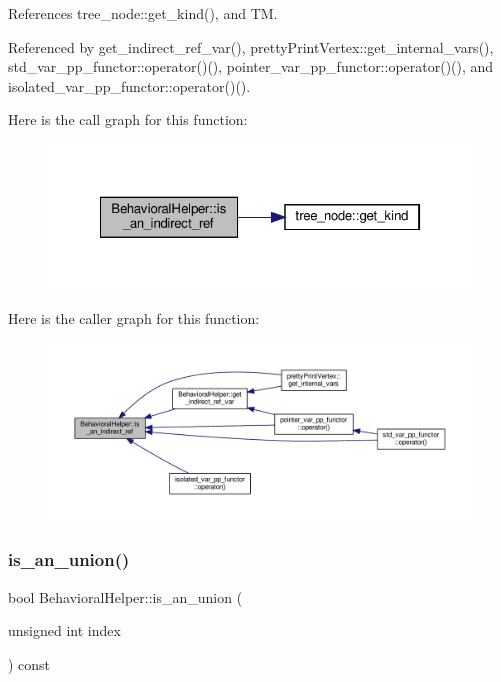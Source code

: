 References tree\+\_\+node\+::get\+\_\+kind(), and TM.



Referenced by get\+\_\+indirect\+\_\+ref\+\_\+var(), pretty\+Print\+Vertex\+::get\+\_\+internal\+\_\+vars(), std\+\_\+var\+\_\+pp\+\_\+functor\+::operator()(), pointer\+\_\+var\+\_\+pp\+\_\+functor\+::operator()(), and isolated\+\_\+var\+\_\+pp\+\_\+functor\+::operator()().

Here is the call graph for this function\+:
\nopagebreak
\begin{figure}[H]
\begin{center}
\leavevmode
\includegraphics[width=322pt]{dd/db2/classBehavioralHelper_ab8596a332f4b4e31b86c750afec5b47f_cgraph}
\end{center}
\end{figure}
Here is the caller graph for this function\+:
\nopagebreak
\begin{figure}[H]
\begin{center}
\leavevmode
\includegraphics[width=350pt]{dd/db2/classBehavioralHelper_ab8596a332f4b4e31b86c750afec5b47f_icgraph}
\end{center}
\end{figure}
\mbox{\label{classBehavioralHelper_a0d2138dc05ca289fb0bd62ebfb09f476}} 
\subsubsection{\texorpdfstring{is\+\_\+an\+\_\+union()}{is\_an\_union()}}
{\footnotesize\ttfamily bool Behavioral\+Helper\+::is\+\_\+an\+\_\+union (\begin{DoxyParamCaption}\item[{unsigned int}]{index }\end{DoxyParamCaption}) const\hspace{0.3cm}{\ttfamily [virtual]}}



